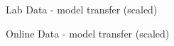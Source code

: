 \documentclass{beamer}
\begin{document}
\begin{frame}{Lab Data - model transfer (scaled)}{\tiny
		
	}  %
	
\end{frame}

\begin{frame}{Online Data - model transfer (scaled)}{\tiny
		
	}  %
\end{frame}
\end{document}
